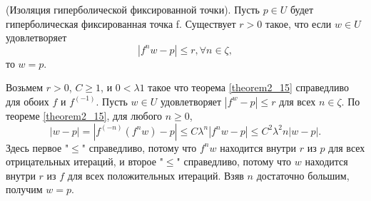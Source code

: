 \begin{theorem}
\label{theorem2_16} (Изоляция гиперболической фиксированной точки). Пусть $p \in U$ будет гиперболическая фиксированная точка f. Существует $r > 0$ такое, что если $w \in U$ удовлетворяет
$$
|f^n w - p| \leq r, \forall n \in \zeta,
$$
то $w = p$.
\end{theorem}
\begin{demo} 
Возьмем $r > 0$, $C \geq 1$, и $0 < \lambda 1$ такое что теорема \ref{theorem2_15} справедливо для обоих $f$  и $f^(-1)$. Пусть $w \in U$ удовлетворяет $|f^ w - p| \leq r$ для всех $n \in \zeta$. По теореме \ref{theorem2_15}, для любого $n \geq 0$,
$$
|w - p| = |f^(-n)(f^n w) - p| \leq C \lambda^n |f^n w - p| \leq C^2 \lambda^2n |w - p|.
$$
Здесь первое "$\leq$" справедливо, потому что $f^n w$ находится внутри $r$ из $p$ для всех отрицательных итераций, и второе "$\leq$" справедливо, потому что $w$ находится внутри $r$ из $f$ для всех положительных итераций. Взяв $n$  достаточно большим, получим $w = p$. 
\end{demo}
 


